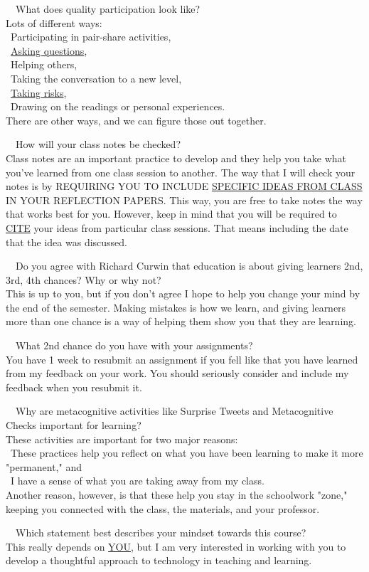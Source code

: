 \documentclass{report}
\newcommand{\QandA}[2]{
	\noindent\faDoubleAngleRight\textsf{~~#1}\\#2\\
	\bigskip
}
\begin{document}
\QandA{What does quality participation look like?}{Lots of different ways:\\ \indent \faHandLeft~Participating in pair-share activities, \\ \indent \faHandLeft~\underline{Asking questions}, \\ \indent \faHandLeft~Helping others, \\ \indent \faHandLeft~Taking the conversation to a new level, \\ \indent \faHandLeft~\underline{Taking risks}, \\ \indent \faHandLeft~Drawing on the readings or personal experiences.\\ \noindent There are other ways, and we can figure those out together.}

\QandA{How will your class notes be checked?}{Class notes are an important practice to develop and they help you take what you've learned from one class session to another. The way that I will check your notes is by \MakeUppercase{requiring you to include \underline{specific ideas from class} in your reflection papers}. This way, you are free to take notes the way that works best for you. However, keep in mind that you will be required to \underline{CITE} your ideas from particular class sessions. That means including the date that the idea was discussed.}

\QandA{Do you agree with Richard Curwin that education is about giving learners 2nd, 3rd, 4th chances? Why or why not?}{This is up to you, but if you don't agree I hope to help you change your mind by the end of the semester. Making mistakes is how we learn, and giving learners more than one chance is a way of helping them show you that they are learning.}

\QandA{What 2nd chance do you have with your assignments?}{You have 1 week to resubmit an assignment if you fell like that you have learned from my feedback on your work. You should seriously consider and include my feedback when you resubmit it.}

\QandA{Why are metacognitive activities like Surprise Tweets and Metacognitive Checks important for learning?}{These activities are important for two major reasons:\\\indent\faHandLeft~These practices help you reflect on what you have been learning to make it more "permanent," and \\ \indent \faHandLeft~I have a sense of what you are taking away from my class.\\Another reason, however, is that these help you stay in the schoolwork "zone," keeping you connected with the class, the materials, and your professor.}

\QandA{Which statement best describes your mindset towards this course?}{This really depends on \underline{\MakeUppercase{You}}, but I am very interested in working with you to develop a thoughtful approach to technology in teaching and learning.}
\end{document}
